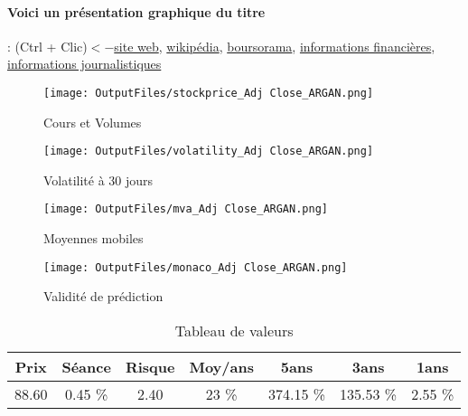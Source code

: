 \documentclass[11pt,a4paper]{report}%
\begin{document}
\paragraph{Voici un présentation graphique du titre} : (Ctrl + Clic)$<-$\href{https://www.argan.fr/espace-investisseurs/}{site web}, \href{https://fr.wikipedia.org/wiki/Argan_(entreprise)}{wikipédia}, \href{https://www.boursorama.com/cours/1rPARG}{boursorama}, \href{https://www.qwant.com/?q=site:https:%2f%2fwww.easybourse.com%2faction-societe%2fARGAN&t=web&client=ext-firefox-hp}{informations financières}, \href{https://bourse.lerevenu.com/cours-de-bourse/fiche-valeur-synthese/ARGAN/ARG-FR}{informations journalistiques}
\begin{figure}[!htb]
   \begin{minipage}{0.5\textwidth}
     \centering
     \texttt{[image: OutputFiles/stockprice\_Adj Close\_ARGAN.png]}
     \caption{Cours et Volumes}\label{Fig:price_ARGAN}
   \end{minipage}\hfill
   \begin{minipage}{0.5\textwidth}
     \centering
     \texttt{[image: OutputFiles/volatility\_Adj Close\_ARGAN.png]}
     \caption{Volatilité à 30 jours}\label{Fig:volat_ARGAN}
   \end{minipage}
\end{figure}
\begin{figure}[!htb]
   \begin{minipage}{0.5\textwidth}
     \centering
     \texttt{[image: OutputFiles/mva\_Adj Close\_ARGAN.png]}
     \caption{Moyennes mobiles}\label{Fig:mva_ARGAN}
   \end{minipage}\hfill
   \begin{minipage}{0.5\textwidth}
     \centering
     \texttt{[image: OutputFiles/monaco\_Adj Close\_ARGAN.png]}
     \caption{Validité de prédiction}\label{Fig:prediction_ARGAN}
   \end{minipage}
\end{figure}

\begin{table}[H]
  \centering
    \begin{tabular}{|c|c|c|c|c|c|c|}
    \hline
    Prix & Séance & Risque  & Moy/ans & 5ans & 3ans & 1ans \\
    \hline
    88.60 &    0.45 \%    & 2.40 & 23 \% & 374.15 \% & 135.53 \% & 2.55 \% \\
    \hline
    \end{tabular}%
        \label{tab:table_ARGAN}%
      \caption{Tableau de valeurs}
\end{table}%
\end{document}
